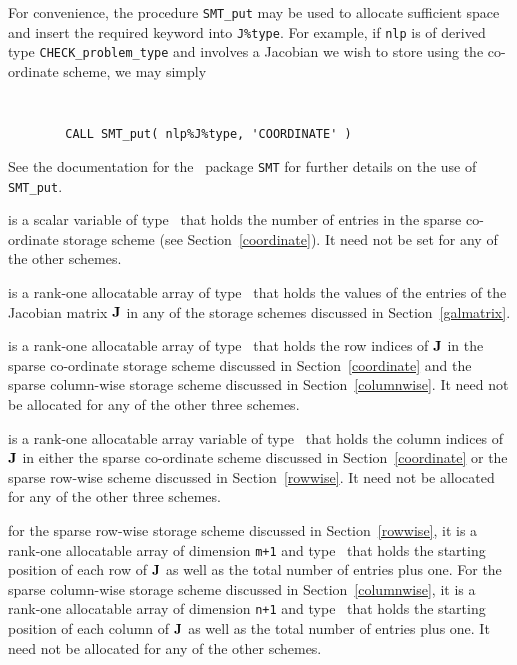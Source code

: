 \documentclass{galahad}
\newcommand{\packagename}{CHECK}
\begin{document}
\begin{description}
\begin{description}
For convenience, the procedure {\tt SMT\_put} 
may be used to allocate sufficient space and insert the required keyword
into {\tt J\%type}.
For example, if {\tt nlp} is of derived type {\tt \packagename\_problem\_type}
and involves a Jacobian we wish to store using the co-ordinate scheme,
we may simply
{\tt 
\begin{verbatim}
        CALL SMT_put( nlp%J%type, 'COORDINATE' )
\end{verbatim}
}
\noindent
See the documentation for the \galahad\ package {\tt SMT} 
for further details on the use of {\tt SMT\_put}.

 is a scalar variable of type \integer\ that 
holds the number of entries in the sparse co-ordinate storage scheme
(see Section~\ref{coordinate}). 
It need not be set for any of the other schemes.

 is a rank-one allocatable array of type \realdp\ that holds
the values of the entries of the Jacobian matrix ${\mathbf{J}}$ in any of the 
storage schemes discussed in Section~\ref{galmatrix}.

 is a rank-one allocatable array of type \integer\
that holds the row indices of ${\mathbf{J}}$ 
in the sparse co-ordinate storage
scheme discussed in Section~\ref{coordinate} and the sparse column-wise storage
scheme discussed in Section~\ref{columnwise}.
It need not be allocated for any of the other three schemes.

 is a rank-one allocatable array variable of type \integer\
that holds the column indices of ${\mathbf{J}}$ in either the sparse co-ordinate 
scheme discussed in Section~\ref{coordinate} or the sparse row-wise 
scheme discussed in Section~\ref{rowwise}.
It need not be allocated for any of the other three schemes.

 for the sparse row-wise storage
scheme discussed in Section~\ref{rowwise}, it is a rank-one allocatable array of dimension {\tt m+1} and type 
\integer\ that holds the starting position of 
each row of ${\mathbf{J}}$ as well
as the total number of entries plus one. For the sparse column-wise storage
scheme discussed in Section~\ref{columnwise}, it is a rank-one allocatable array of dimension {\tt n+1} and type 
\integer\ that holds the starting position of 
each column of ${\mathbf{J}}$ as well
as the total number of entries plus one. It need not be
allocated for any of the other schemes.

\end{description}


\end{description}
\end{document}
